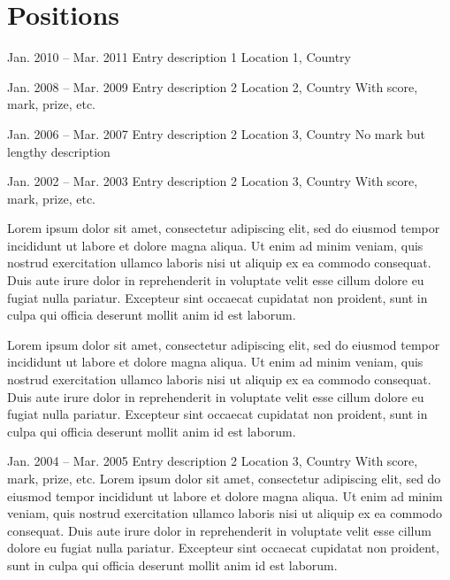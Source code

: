 
\section{Positions}%
    
\begin{cventries}[left]

    \cventry
    {Jan. 2010 -- Mar. 2011}%
    {Entry description 1}%
    {Location 1, Country}%
    {}%
    {}%

    \cventry
    {Jan. 2008 -- Mar. 2009}%
    {Entry description 2}%
    {Location 2, Country}%
    {With score, mark, prize, etc.}%
    {}%

    \cventry
    {Jan. 2006 -- Mar. 2007}%
    {Entry description 2}%
    {Location 3, Country}%
    {}%
    {No mark but lengthy description}%

    \cventry
    {Jan. 2002 -- Mar. 2003}%
    {Entry description 2}%
    {Location 3, Country}%
    {With score, mark, prize, etc.}%
    {%
        \begin{cvitems}%
            \item Lorem ipsum dolor sit amet, consectetur adipiscing elit, sed do eiusmod tempor incididunt ut labore et dolore magna aliqua. Ut enim ad minim veniam, quis nostrud exercitation ullamco laboris nisi ut aliquip ex ea commodo consequat. Duis aute irure dolor in reprehenderit in voluptate velit esse cillum dolore eu fugiat nulla pariatur. Excepteur sint occaecat cupidatat non proident, sunt in culpa qui officia deserunt mollit anim id est laborum.
            \item Lorem ipsum dolor sit amet, consectetur adipiscing elit, sed do eiusmod tempor incididunt ut labore et dolore magna aliqua. Ut enim ad minim veniam, quis nostrud exercitation ullamco laboris nisi ut aliquip ex ea commodo consequat. Duis aute irure dolor in reprehenderit in voluptate velit esse cillum dolore eu fugiat nulla pariatur. Excepteur sint occaecat cupidatat non proident, sunt in culpa qui officia deserunt mollit anim id est laborum.
        \end{cvitems}%
    }%
    
    \cventry
    {Jan. 2004 -- Mar. 2005}%
    {Entry description 2}%
    {Location 3, Country}%
    {With score, mark, prize, etc.}%
    {Lorem ipsum dolor sit amet, consectetur adipiscing elit, sed do eiusmod tempor incididunt ut labore et dolore magna aliqua. Ut enim ad minim veniam, quis nostrud exercitation ullamco laboris nisi ut aliquip ex ea commodo consequat. Duis aute irure dolor in reprehenderit in voluptate velit esse cillum dolore eu fugiat nulla pariatur. Excepteur sint occaecat cupidatat non proident, sunt in culpa qui officia deserunt mollit anim id est laborum.}

\end{cventries}

\clearsection
